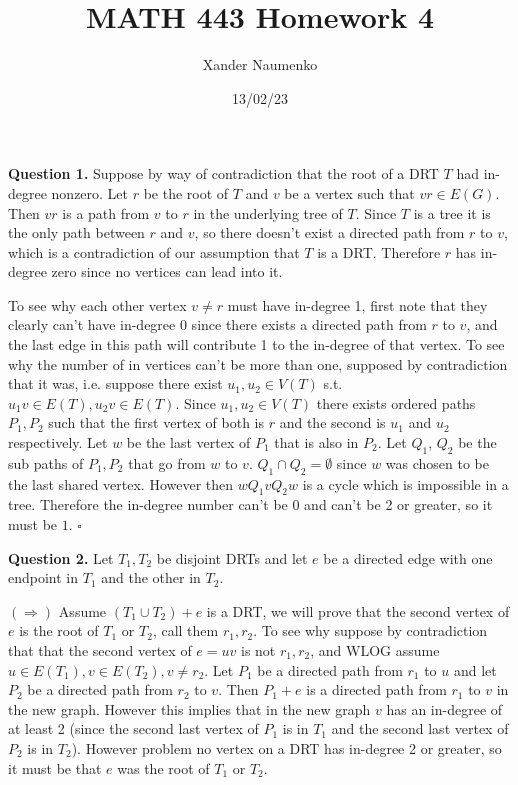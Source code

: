 \documentclass[letterpaper, reqno,11pt]{article}
\begin{document}
\title{MATH 443 Homework 4}
\date{13/02/23}
\author{Xander Naumenko}
\maketitle

{\medskip\noindent\bf Question 1.} Suppose by way of contradiction that the root of a DRT $T$ had in-degree nonzero. Let $r$ be the root of $T$ and $v$ be a vertex such that $vr\in E(G)$. Then $vr$ is a path from $v$ to $r$ in the underlying tree of $T$. Since $T$ is a tree it is the only path between $r$ and $v$, so there doesn't exist a directed path from $r$ to $v$, which is a contradiction of our assumption that $T$ is a DRT. Therefore $r$ has in-degree zero since no vertices can lead into it. 

To see why each other vertex $v\neq r$ must have in-degree 1, first note that they clearly can't have in-degree 0 since there exists a directed path from $r$ to $v$, and the last edge in this path will contribute 1 to the in-degree of that vertex. To see why the number of in vertices can't be more than one, supposed by contradiction that it was, i.e. suppose there exist $u_1,u_2\in V(T)$ s.t. $u_1v\in E(T), u_2v\in E(T)$. Since $u_1,u_2\in V(T)$ there exists ordered paths $P_1,P_2$ such that the first vertex of both is $r$ and the second is $u_1$ and $u_2$ respectively. Let $w$ be the last vertex of $P_1$ that is also in $P_2$. Let $Q_1$, $Q_2$ be the sub paths of $P_1,P_2$ that go from $w$ to $v$. $Q_1\cap Q_2=\emptyset$ since $w$ was chosen to be the last shared vertex. However then $wQ_1vQ_2w$ is a cycle which is impossible in a tree. Therefore the in-degree number can't be 0 and can't be 2 or greater, so it must be $1$. $\square$

{\medskip\noindent\bf Question 2.} Let $T_1,T_2$ be disjoint DRTs and let $e$ be a directed edge with one endpoint in $T_1$ and the other in $T_2$. 

$(\Rightarrow)$ Assume $(T_1\cup T_2)+e$ is a DRT, we will prove that the second vertex of $e$ is the root of $T_1$ or $T_2$, call them $r_1,r_2$. To see why suppose by contradiction that that the second vertex of $e=uv$ is not $r_1,r_2$, and WLOG assume $u\in E(T_1),v\in E(T_2), v\neq r_2$. Let $P_1$ be a directed path from $r_1$ to $u$ and let $P_2$ be a directed path from $r_2$ to $v$. Then $P_1+e$ is a directed path from $r_1$ to $v$ in the new graph. However this implies that in the new graph $v$ has an in-degree of at least 2 (since the second last vertex of $P_1$ is in $T_1$ and the second last vertex of $P_2$ is in $T_2$). However problem no vertex on a DRT has in-degree 2 or greater, so it must be that $e$ was the root of $T_1$ or $T_2$. 
\end{document}
